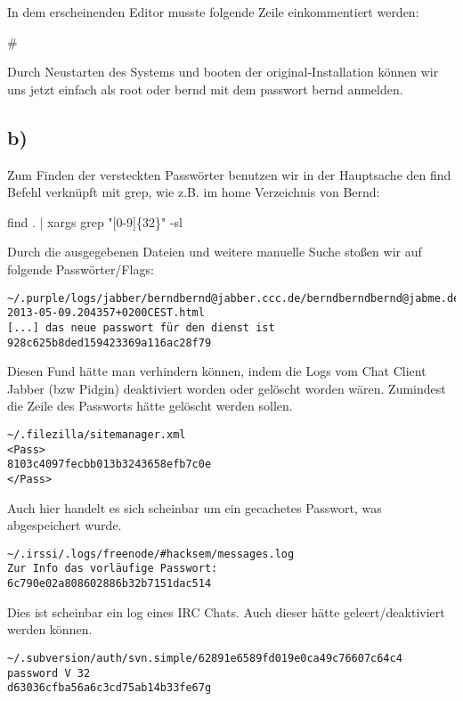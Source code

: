 \documentclass[10pt,a4paper]{article}
\begin{document}
In dem erscheinenden Editor musste folgende Zeile einkommentiert werden:

\# %

Durch Neustarten des Systems und booten der original-Installation können wir uns jetzt einfach als root oder bernd mit dem passwort bernd anmelden.

\subsection*{b)}

Zum Finden der versteckten Passwörter benutzen wir in der Hauptsache den find Befehl verknüpft mit grep, wie z.B. im home Verzeichnis von Bernd:

find . | xargs grep "[0-9]\{32\}" -sl

Durch die ausgegebenen Dateien und weitere manuelle Suche stoßen wir auf folgende Passwörter/Flags:

\begin{verbatim}
~/.purple/logs/jabber/berndbernd@jabber.ccc.de/berndberndbernd@jabme.de/
2013-05-09.204357+0200CEST.html
[...] das neue passwort für den dienst ist
928c625b8ded159423369a116ac28f79
\end{verbatim}

Diesen Fund hätte man verhindern können, indem die Logs vom Chat Client Jabber (bzw Pidgin) deaktiviert worden oder gelöscht worden wären. Zumindest die Zeile des Passworts hätte gelöscht werden sollen.

\begin{verbatim}
~/.filezilla/sitemanager.xml
<Pass>
8103c4097fecbb013b3243658efb7c0e
</Pass>
\end{verbatim}

Auch hier handelt es sich scheinbar um ein gecachetes Passwort, was abgespeichert wurde.

\begin{verbatim}
~/.irssi/.logs/freenode/#hacksem/messages.log
Zur Info das vorläufige Passwort:
6c790e02a808602886b32b7151dac514
\end{verbatim}

Dies ist scheinbar ein log eines IRC Chats. Auch dieser hätte geleert/deaktiviert werden können.

\begin{verbatim}
~/.subversion/auth/svn.simple/62891e6589fd019e0ca49c76607c64c4
password V 32
d63036cfba56a6c3cd75ab14b33fe67g
\end{verbatim}
\end{document}
